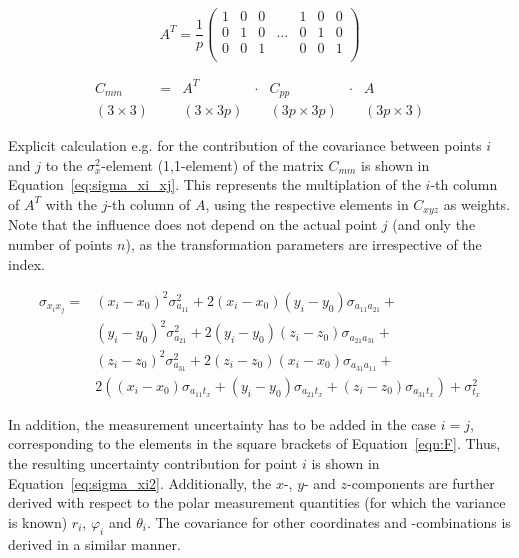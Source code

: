 \documentclass[preprint,12pt,3p]{elsarticle}
\begin{document}
\begin{equation}
    A^T = \frac{1}{p}\begin{pmatrix}
     1 & 0 & 0 & & 1 & 0 & 0 \\
     0 & 1 & 0 & \dots & 0 & 1 & 0 \\
     0 & 0 & 1 & & 0 & 0 & 1 \\
    \end{pmatrix}
    \label{eq:J}
\end{equation}



\begin{equation}
\begin{matrix} C_{mm} & = & A^T & \cdot &  C_{pp} & \cdot & A \\
(3 \times 3) & & (3 \times 3p) & & (3p \times 3p) & & (3p \times 3)
\end{matrix}
\label{eq:C_pp}
\end{equation}


Explicit calculation e.g. for the contribution of the covariance between points $i$ and $j$ to the $\sigma_{x}^2$-element (1,1-element) of the matrix $C_{mm}$ is shown in Equation~\ref{eq:sigma_xi_xj}. This represents the multiplation of the $i$-th column of $A^T$ with the $j$-th column of $A$, using the respective elements in $C_{xyz}$ as weights. Note that the influence does not depend on the actual point $j$ (and only the number of points $n$), as the transformation parameters are irrespective of the index.

\begin{equation}
\begin{array}{rl}
    \sigma_{x_i  x_j} = & \left( x_i-x_0 \right)^2 \sigma^2_{a_{11}} + 2 \left(x_i -x_0 \right) \left( y_i - y_0 \right) \sigma_{a_{11}a_{21}} + \\
    &
    \left( y_i-y_0 \right)^2 \sigma^2_{a_{21}} + 2 \left(y_i -y_0 \right) \left( z_i - z_0 \right) \sigma_{a_{21}a_{31}} + \\
    &
    \left( z_i-z_0 \right)^2 \sigma^2_{a_{31}} + 2 \left(z_i -z_0 \right) \left( x_i - x_0 \right) \sigma_{a_{31}a_{11}} + \\
    &
    2 \left( \left( x_i - x_0 \right) \sigma_{a_{11} t_x}+ \left( y_i - y_0 \right) \sigma_{a_{21} t_x}+ \left( z_i - z_0 \right) \sigma_{a_{31} t_x} \right) + \sigma^2_{t_x}
\end{array}
\label{eq:sigma_xi_xj}
\end{equation}

In addition, the measurement uncertainty has to be added in the case $i=j$, corresponding to the elements in the square brackets of Equation~\ref{eqn:F}. Thus, the resulting uncertainty contribution for point $i$ is shown in Equation~\ref{eq:sigma_xi2}. Additionally, the $x$-, $y$- and $z$-components are further derived with respect to the polar measurement quantities (for which the variance is known) $r_i$, $\varphi_i$ and $\theta_i$. The covariance for other coordinates and -combinations is derived in a similar manner.
\end{document}
